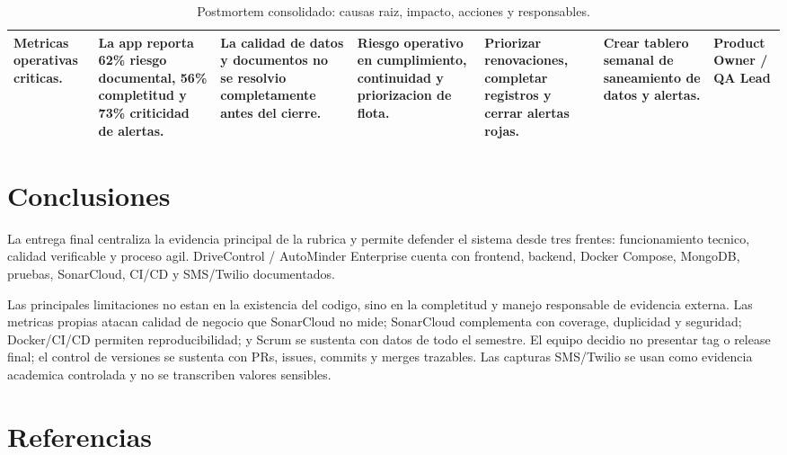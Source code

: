 \documentclass[11pt,a4paper]{article}
\begin{document}
\begin{landscape}
\begin{table}[H]
\begin{tabularx}{\linewidth}{P{2.8cm}P{3.3cm}P{3.2cm}P{2.5cm}P{3.4cm}P{3.4cm}P{2.5cm}}
Metricas operativas criticas. & La app reporta 62\% riesgo documental, 56\% completitud y 73\% criticidad de alertas. & La calidad de datos y documentos no se resolvio completamente antes del cierre. & Riesgo operativo en cumplimiento, continuidad y priorizacion de flota. & Priorizar renovaciones, completar registros y cerrar alertas rojas. & Crear tablero semanal de saneamiento de datos y alertas. & Product Owner / QA Lead \\
\bottomrule
\end{tabularx}
\caption{Postmortem consolidado: causas raiz, impacto, acciones y responsables.}
\end{table}
\end{landscape}



\section{Conclusiones}

La entrega final centraliza la evidencia principal de la rubrica y permite defender el sistema desde tres frentes: funcionamiento tecnico, calidad verificable y proceso agil. DriveControl / AutoMinder Enterprise cuenta con frontend, backend, Docker Compose, MongoDB, pruebas, SonarCloud, CI/CD y SMS/Twilio documentados.

Las principales limitaciones no estan en la existencia del codigo, sino en la completitud y manejo responsable de evidencia externa. Las metricas propias atacan calidad de negocio que SonarCloud no mide; SonarCloud complementa con coverage, duplicidad y seguridad; Docker/CI/CD permiten reproducibilidad; y Scrum se sustenta con datos de todo el semestre. El equipo decidio no presentar tag o release final; el control de versiones se sustenta con PRs, issues, commits y merges trazables. Las capturas SMS/Twilio se usan como evidencia academica controlada y no se transcriben valores sensibles.

\section{Referencias}
\end{document}
